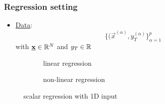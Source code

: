 \begin{frame}\frametitle{Regression setting}


\begin{itemize}
\item[] \underline{Data}:\\
    \begin{equation}
    \big\{ (\vec x^{(\alpha)}, y_{T}^{(\alpha)}\big\}_{\alpha=1}^{p}
    \end{equation}
    with $\underline{\mathbf{x}} \in \mathbb{R}^{N}$ and $y_{T} \in \mathbb{R}${}


    
\end{itemize}


\begin{figure}[h]
     \centering
     \begin{subfigure}[t]{0.35\textwidth}
         \centering
         \usebox{\imagebox}%
         \caption{linear regression}
         \label{fig:regression1dlinear}
     \end{subfigure}
     \hspace{10mm}
     \begin{subfigure}[t]{0.35\textwidth}
         \centering
         \caption{non-linear regression}
         \label{fig:regression1dnonlinear}
     \end{subfigure}
     \caption{scalar regression with 1D input}
	 \label{fig:regression}
\end{figure}



\end{frame}

